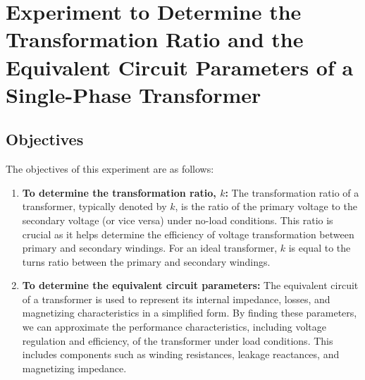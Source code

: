 \documentclass[12pt,a4paper]{report}
\begin{document}
\tableofcontents
\newpage

\listoffigures
\newpage

\listoftables
\newpage


\chapter{Experiment to Determine the Transformation Ratio and the Equivalent Circuit Parameters of a Single-Phase Transformer}

\section{Objectives}
The objectives of this experiment are as follows:
\begin{enumerate}[label=\roman*.]
    \item \textbf{To determine the transformation ratio, \(k\):} The transformation ratio of a transformer, typically denoted by \(k\), is the ratio of the primary voltage to the secondary voltage (or vice versa) under no-load conditions. This ratio is crucial as it helps determine the efficiency of voltage transformation between primary and secondary windings. For an ideal transformer, \(k\) is equal to the turns ratio between the primary and secondary windings.
    
    \item \textbf{To determine the equivalent circuit parameters:} The equivalent circuit of a transformer is used to represent its internal impedance, losses, and magnetizing characteristics in a simplified form. By finding these parameters, we can approximate the performance characteristics, including voltage regulation and efficiency, of the transformer under load conditions. This includes components such as winding resistances, leakage reactances, and magnetizing impedance.
\end{enumerate}
\end{document}
